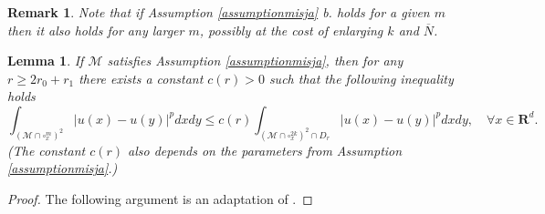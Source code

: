 \documentclass[11pt]{article}
\newcommand{\R}{\mathbf{R}}
\def\M{\mathcal{M}}
\newtheorem{lemma}[theorem]{Lemma}
\newtheorem{remark}[theorem]{Remark}
\theoremstyle{remark}
\begin{document}
\begin{appendices}
\begin{remark}\label{rA.4}
Note that if Assumption \ref{assumptionmisja} b. holds for a given $m$ then it also holds for any larger $m$, possibly at the cost of enlarging $k$ and $\overline{N}$.
\end{remark}

\begin{lemma}
	\label{lemma:crucialest}
	If $\M$ satisfies Assumption \ref{assumptionmisja},
	then for any $r\ge 2 r_0 + r_1$ there exists a constant $c(r)>0$  such that the following inequality holds
	\begin{equation}
		\label{stimadiag2}
		\int_{(\M\cap \square_x^m)^2} |u(x)-u(y)|^pdx dy\leq c(r) \int_{(\M\cap \square^{2k}_x)^2\cap D_r} |u(x)-u(y)|^pdxdy, \quad \forall x\in\R^d.
	\end{equation}
	(The constant $c(r)$ also depends on the parameters from Assumption \ref{assumptionmisja}.)
\end{lemma}
\begin{proof}
	The following argument is an adaptation of \cite[Lemma 3.3]{BCE2021}.
	

\end{proof}
\end{appendices}
\end{document}
